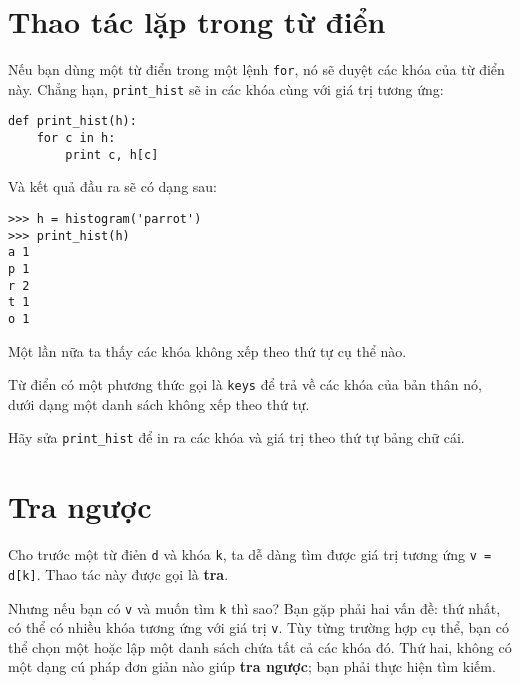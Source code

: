 \documentclass[11pt]{book}
\begin{document}
\section{Thao tác lặp trong từ điển}


Nếu bạn dùng một từ điển trong một lệnh {\tt for}, nó sẽ duyệt các
khóa của từ điển này. Chẳng hạn, \verb"print_hist" sẽ in các khóa
cùng với giá trị tương ứng:

\beforeverb
\begin{verbatim}
def print_hist(h):
    for c in h:
        print c, h[c]
\end{verbatim}
\afterverb
%
Và kết quả đầu ra sẽ có dạng sau:

\beforeverb
\begin{verbatim}
>>> h = histogram('parrot')
>>> print_hist(h)
a 1
p 1
r 2
t 1
o 1
\end{verbatim}
\afterverb
%
Một lần nữa ta thấy các khóa không xếp theo thứ tự cụ thể nào.

\begin{ex}


Từ điển có một phương thức gọi là {\tt keys} để trả về các khóa
của bản thân nó, dưới dạng một danh sách không 
xếp theo thứ tự.

Hãy sửa \verb"print_hist" để in ra các khóa và giá trị theo 
thứ tự bảng chữ cái.

\end{ex}



\section{Tra ngược}


Cho trước một từ điẻn {\tt d} và khóa {\tt k}, ta dễ dàng tìm
được giá trị tương ứng {\tt v = d[k]}.  Thao tác này được gọi là
{\bf tra}.

Nhưng nếu bạn có {\tt v} và muốn tìm {\tt k} thì sao? 
Bạn gặp phải hai vấn đề: thứ nhất, có thể có nhiều khóa tương ứng
với giá trị {\tt v}. Tùy từng trường hợp cụ thể, bạn có thể chọn
một hoặc lập một danh sách chứa tất cả các khóa đó. Thứ hai, 
không có một dạng cú pháp đơn giản nào giúp {\bf tra ngược};
bạn phải thực hiện tìm kiếm.
\end{document}
